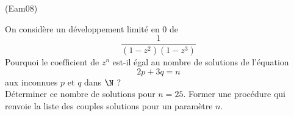 \begin{tiny}(Eam08)\end{tiny}
On considère un développement limité en $0$ de 
\begin{displaymath}
 \dfrac{1}{(1-z^2)(1-z^3)}
\end{displaymath}
Pourquoi le coefficient de $z^n$ est-il égal au nombre de solutions de l'équation
\begin{displaymath}
 2p+3q=n
\end{displaymath}
aux inconnues $p$ et $q$ dans $\N$ ?\\
Déterminer ce nombre de solutions pour $n=25$. Former une procédure qui renvoie la liste des couples solutions pour un paramètre $n$.

